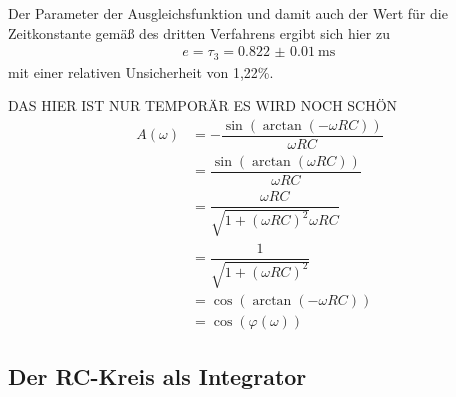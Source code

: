 Der Parameter der Ausgleichsfunktion und damit auch der Wert für die
Zeitkonstante gemäß des dritten Verfahrens ergibt sich hier zu
\begin{align}
  e = \tau_3 = \SI{0.822(0010)}{\milli\second}\,
\end{align}
mit einer relativen Unsicherheit von 1,22\%.


DAS HIER IST NUR TEMPORÄR ES WIRD NOCH SCHÖN
\begin{align*}
  A(\omega) &= -\dfrac{\sin(\arctan(-\omega RC))}{\omega RC}\\
  &= \dfrac{\sin(\arctan(\omega RC))}{\omega RC} \\
  &= \dfrac{\omega RC}{\sqrt{1 + (\omega RC)^{2}} \omega RC} \\
  &= \dfrac{1}{\sqrt{1 + (\omega RC)^{2}}} \\
  &= \cos(\arctan(-\omega RC))\\
  &= \cos(\varphi(\omega))
\end{align*}

\subsection{Der RC-Kreis als Integrator}

